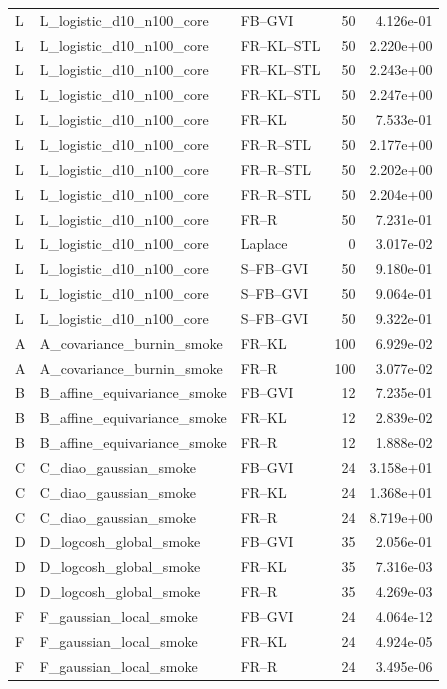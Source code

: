 \begin{tabular}{lllrr}
L & L_logistic_d10_n100_core & FB--GVI & 50 & 4.126e-01 \\
L & L_logistic_d10_n100_core & FR--KL--STL & 50 & 2.220e+00 \\
L & L_logistic_d10_n100_core & FR--KL--STL & 50 & 2.243e+00 \\
L & L_logistic_d10_n100_core & FR--KL--STL & 50 & 2.247e+00 \\
L & L_logistic_d10_n100_core & FR--KL & 50 & 7.533e-01 \\
L & L_logistic_d10_n100_core & FR--R--STL & 50 & 2.177e+00 \\
L & L_logistic_d10_n100_core & FR--R--STL & 50 & 2.202e+00 \\
L & L_logistic_d10_n100_core & FR--R--STL & 50 & 2.204e+00 \\
L & L_logistic_d10_n100_core & FR--R & 50 & 7.231e-01 \\
L & L_logistic_d10_n100_core & Laplace & 0 & 3.017e-02 \\
L & L_logistic_d10_n100_core & S--FB--GVI & 50 & 9.180e-01 \\
L & L_logistic_d10_n100_core & S--FB--GVI & 50 & 9.064e-01 \\
L & L_logistic_d10_n100_core & S--FB--GVI & 50 & 9.322e-01 \\
A & A_covariance_burnin_smoke & FR--KL & 100 & 6.929e-02 \\
A & A_covariance_burnin_smoke & FR--R & 100 & 3.077e-02 \\
B & B_affine_equivariance_smoke & FB--GVI & 12 & 7.235e-01 \\
B & B_affine_equivariance_smoke & FR--KL & 12 & 2.839e-02 \\
B & B_affine_equivariance_smoke & FR--R & 12 & 1.888e-02 \\
C & C_diao_gaussian_smoke & FB--GVI & 24 & 3.158e+01 \\
C & C_diao_gaussian_smoke & FR--KL & 24 & 1.368e+01 \\
C & C_diao_gaussian_smoke & FR--R & 24 & 8.719e+00 \\
D & D_logcosh_global_smoke & FB--GVI & 35 & 2.056e-01 \\
D & D_logcosh_global_smoke & FR--KL & 35 & 7.316e-03 \\
D & D_logcosh_global_smoke & FR--R & 35 & 4.269e-03 \\
F & F_gaussian_local_smoke & FB--GVI & 24 & 4.064e-12 \\
F & F_gaussian_local_smoke & FR--KL & 24 & 4.924e-05 \\
F & F_gaussian_local_smoke & FR--R & 24 & 3.495e-06 \\

\end{tabular}
